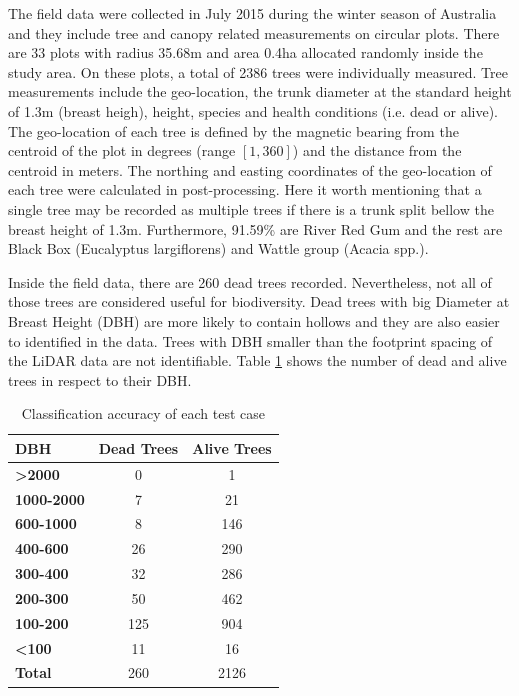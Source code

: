 \documentclass{subfiles}
\begin{document}
\par The field data were collected in July 2015 during the winter season of Australia and they include tree and canopy related measurements on circular plots. There are 33 plots with radius 35.68m and area 0.4ha  allocated randomly inside the study area. On these plots, a total of 2386 trees were individually measured.  Tree measurements include the geo-location, the trunk diameter at the standard height of 1.3m (breast heigh), height, species and health conditions (i.e. dead or alive). The geo-location of each tree is defined by the magnetic bearing from the centroid of the plot in degrees (range $[1,360]$) and the distance from the centroid in meters. The northing and easting coordinates of the geo-location of each tree were calculated in post-processing. Here it worth mentioning that a single tree may be recorded as multiple trees if there is a trunk split bellow the breast height of 1.3m. Furthermore, 91.59\% are River Red Gum and the rest are Black Box (Eucalyptus largiflorens) and Wattle group (Acacia spp.).

\par Inside the field data, there are 260 dead trees recorded. Nevertheless, not all of those trees are considered useful for biodiversity. Dead trees with big Diameter at Breast Height (DBH) are more likely to contain hollows and they are also easier to identified in the data. Trees with DBH smaller than the footprint spacing of the LiDAR data are not identifiable. Table \ref{tab:DBH} shows the number of dead and alive trees in respect to their DBH. 

\begin{table}[!h]
	\centering
	\begin{tabular}{| l || c | c | }
		\hline		
		\textbf{DBH} &\textbf{Dead Trees} & \textbf{Alive Trees }\\	
		\hline			
		\hline			
		\textbf{>2000} & 0 & 1\\
		\hline			
		\textbf{1000-2000} & 7 & 21\\
		\hline			
		\textbf{600-1000} & 8 & 146\\
		\hline			
		\textbf{400-600} & 26 & 290\\
		\hline			
		\textbf{300-400} & 32 & 286\\
		\hline			
		\textbf{200-300} & 50 & 462\\
		\hline			
		\textbf{100-200} &125 & 904\\
		\hline			
		\textbf{<100} & 11 & 16\\
		\hline			
		\textbf{Total} & 260 & 2126 \\
		
		
		
		
		\hline  
	\end{tabular}
	\caption{ Classification accuracy of each test case}
	\label{tab:DBH}
\end{table}
\end{document}
